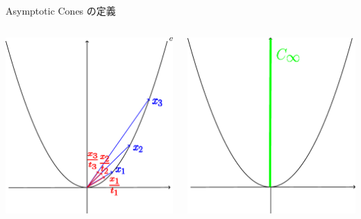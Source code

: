 \documentclass[aspectratio=169, dvipdfmx, 11pt]{beamer} %
\begin{document}
\begin{frame}{Asymptotic Cones の定義}
  \centering
  \begin{columns}
    \pause
    \begin{column}{0.48\textwidth}
    \centering
    \includegraphics[keepaspectratio, scale=0.095]{figures/figure_asymptotic_cone_1.eps}
    \end{column}
    \pause
    \begin{column}{0.48\textwidth}
    \centering
    \includegraphics[keepaspectratio, scale=0.095]{figures/figure_asymptotic_cone_2.eps}
    \end{column}
  \end{columns}
\end{frame}
\end{document}
